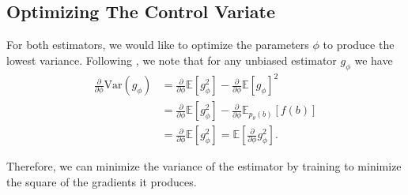 \documentclass{article}
\newcommand{\relaxed}{r}
\newcommand{\var}{\mathbb{V}}
\newcommand{\E}{\mathbb{E}}
\newcommand{\PPH}{\frac{\partial}{\partial \phi}}
\begin{document}
\subsection{Optimizing The Control Variate}
For both estimators, we would like to optimize the parameters $\phi$ to produce the lowest variance. Following \cite{tucker2017rebar}, we note that for any unbiased estimator $g_\phi$ we have 
\begin{align}
\PPH \text{Var}(g_\phi) &= \PPH \E[g_\phi^2] - \PPH \E[g_\phi]^2\\
&= \PPH \E[g_\phi^2] - \PPH \E_{p_\theta(b)}[f(b)]\\
& = \PPH \E[g_\phi^2]  = \E[\PPH g_\phi^2].
\end{align}

Therefore, we can minimize the variance of the estimator by training to minimize the square of the gradients it produces. 



\end{document}
